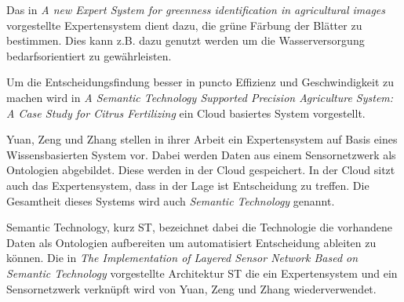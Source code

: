 Das in \textit{A new Expert System for greenness identification in agricultural images} vorgestellte Expertensystem dient dazu, die grüne Färbung der Blätter zu bestimmen. Dies kann z.B. dazu genutzt werden um die Wasserversorgung bedarfsorientiert zu gewährleisten.\cite{jour:Romeo2013}

Um die Entscheidungsfindung besser in puncto Effizienz und Geschwindigkeit zu machen wird in \textit{A Semantic Technology Supported Precision Agriculture System: A Case Study for Citrus Fertilizing} ein Cloud basiertes System vorgestellt. \cite{jour:Yuan2013}


Yuan, Zeng und Zhang stellen in ihrer Arbeit ein Expertensystem auf Basis eines Wissensbasierten System vor. Dabei werden Daten aus einem Sensornetzwerk als Ontologien abgebildet. Diese werden in der Cloud gespeichert. In der Cloud sitzt auch das Expertensystem, dass in der Lage ist Entscheidung zu treffen. Die Gesamtheit dieses Systems wird auch \textit{Semantic Technology} genannt.\cite{jour:Yuan2013}

Semantic Technology, kurz ST, bezeichnet dabei die Technologie die vorhandene Daten als  Ontologien aufbereiten um automatisiert Entscheidung ableiten zu können. Die in \textit{The Implementation of Layered Sensor Network Based on Semantic Technology} vorgestellte Architektur ST die ein Expertensystem und ein Sensornetzwerk verknüpft wird von Yuan, Zeng und Zhang wiederverwendet.\cite{jour:Liu2012}